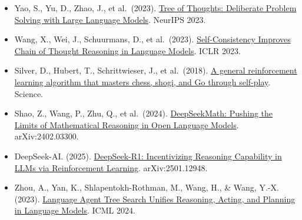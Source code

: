 \vspace{0.25em}
\begin{itemize}
\tightlist
\item
  Yao, S., Yu, D., Zhao, J., et al.~(2023). \href{https://arxiv.org/abs/2305.10601}{Tree of Thoughts: Deliberate Problem Solving with Large Language Models}. NeurIPS 2023.
\item
  Wang, X., Wei, J., Schuurmans, D., et al.~(2023). \href{https://openreview.net/forum?id=1PL1NIMMrw}{Self-Consistency Improves Chain of Thought Reasoning in Language Models}. ICLR 2023.
\item
  Silver, D., Hubert, T., Schrittwieser, J., et al.~(2018). \href{https://www.science.org/doi/10.1126/science.aar6404}{A general reinforcement learning algorithm that masters chess, shogi, and Go through self-play}. Science.
\item
  Shao, Z., Wang, P., Zhu, Q., et al.~(2024). \href{https://arxiv.org/abs/2402.03300}{DeepSeekMath: Pushing the Limits of Mathematical Reasoning in Open Language Models}. arXiv:2402.03300.
\item
  DeepSeek-AI. (2025). \href{https://arxiv.org/abs/2501.12948}{DeepSeek-R1: Incentivizing Reasoning Capability in LLMs via Reinforcement Learning}. arXiv:2501.12948.
\item
  Zhou, A., Yan, K., Shlapentokh-Rothman, M., Wang, H., \& Wang, Y.-X. (2023). \href{https://arxiv.org/abs/2310.04406}{Language Agent Tree Search Unifies Reasoning, Acting, and Planning in Language Models}. ICML 2024.
\end{itemize}

\clearpage

